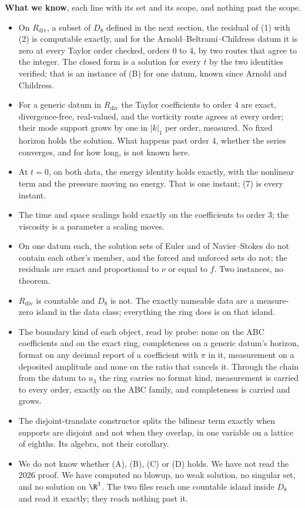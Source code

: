 \textbf{What we know}, each line with its set and its scope, and nothing past the scope.

\begin{itemize}
\item On $R_{\mathrm{div}}$, a subset of $D_8$ defined in the next section, the residual of (1) with
  (2) is computable exactly, and for the Arnold--Beltrami--Childress datum it is zero at every Taylor
  order checked, orders 0 to 4, by two routes that agree to the integer. The closed form is a solution
  for every $t$ by the two identities verified; that is an instance of (B) for one datum, known since
  Arnold and Childress.
\item For a generic datum in $R_{\mathrm{div}}$ the Taylor coefficients to order 4 are exact,
  divergence-free, real-valued, and the vorticity route agrees at every order; their mode support
  grows by one in $|k|_1$ per order, measured. No fixed horizon holds the solution. What happens
  past order 4, whether the series converges, and for how long, is not known here.
\item At $t = 0$, on both data, the energy identity holds exactly, with the nonlinear term and the
  pressure moving no energy. That is one instant; (7) is every instant.
\item The time and space scalings hold exactly on the coefficients to order 3; the viscosity is a
  parameter a scaling moves.
\item On one datum each, the solution sets of Euler and of Navier--Stokes do not contain each other's
  member, and the forced and unforced sets do not; the residuals are exact and proportional to $\nu$
  or equal to $f$. Two instances, no theorem.
\item $R_{\mathrm{div}}$ is countable and $D_8$ is not. The exactly nameable data are a
  measure-zero island in the data class; everything the ring does is on that island.
\item The boundary kind of each object, read by probe: none on the ABC coefficients and on the exact
  ring, completeness on a generic datum's horizon, format on any decimal report of a coefficient with
  $\pi$ in it, measurement on a deposited amplitude and none on the ratio that cancels it. Through the
  chain from the datum to $u_3$ the ring carries no format kind, measurement is carried to every
  order, exactly on the ABC family, and completeness is carried and grows.
\item The disjoint-translate constructor splits the bilinear term exactly when supports are disjoint
  and not when they overlap, in one variable on a lattice of eighths. Its algebra, not their
  corollary.
\item We do not know whether (A), (B), (C) or (D) holds. We have not read the 2026 proof. We have
  computed no blowup, no weak solution, no singular set, and no solution on $\R^3$. The two files
  reach one countable island inside $D_8$ and read it exactly; they reach nothing past it.
\end{itemize}

